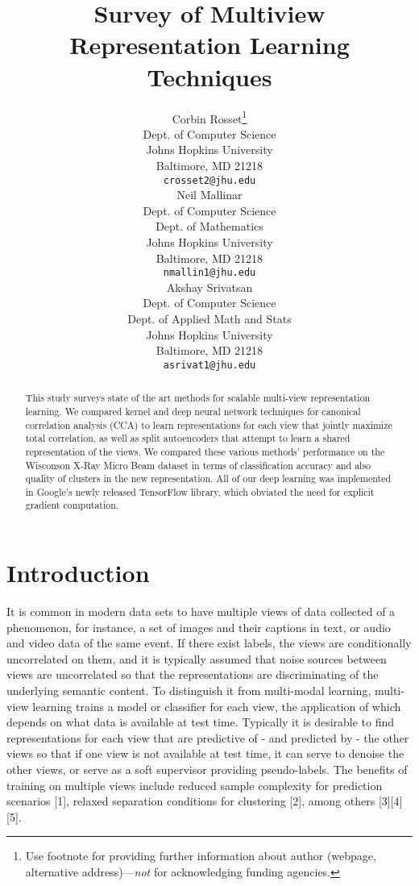 \documentclass{article} %
\title{Survey of Multiview Representation Learning Techniques}
\author{
Corbin Rosset\thanks{ Use footnote for providing further information
about author (webpage, alternative address)---\emph{not} for acknowledging
funding agencies.} \\
Dept. of Computer Science\\
Johns Hopkins University\\
Baltimore, MD 21218 \\
\texttt{crosset2@jhu.edu} \\
\And
Neil Mallinar\\
Dept. of Computer Science \\
Dept. of Mathematics \\
Johns Hopkins University \\
Baltimore, MD 21218 \\
\texttt{nmallin1@jhu.edu} \\
\And
Akshay Srivatsan \\
Dept. of Computer Science \\
Dept. of Applied Math and Stats \\
Johns Hopkins University \\
Baltimore, MD 21218 \\
\texttt{asrivat1@jhu.edu} \\
}
\begin{document}
\maketitle

\begin{abstract}

This study surveys state of the art methods for scalable multi-view representation learning. We compared kernel and deep neural network techniques for canonical correlation analysis (CCA) to learn representations for each view that jointly maximize total correlation, as well as split autoencoders that attempt to learn a shared representation of the views. We compared these various methods' performance on the Wisconson X-Ray Micro Beam dataset in terms of classification accuracy and also quality of clusters in the new representation. All of our deep learning was implemented in Google's newly released TensorFlow library, which obviated the need for explicit gradient computation.

\end{abstract}

\section{Introduction}

It is common in modern data sets to have multiple views of data collected of a phenomenon, for instance, a set of images and their captions in text, or audio and video data of the same event. If there exist labels, the views are conditionally uncorrelated on them, and it is typically assumed that noise sources between views are uncorrelated so that the representations are discriminating of the underlying semantic content. To distinguish it from multi-modal learning, multi-view learning trains a model or classifier for each view, the application of which depends on what data is available at test time. Typically it is desirable to find representations for each view that are predictive of - and predicted by - the other views so that if one view is not available at test time, it can serve to denoise the other views, or serve as a soft supervisor providing pseudo-labels. The benefits of training on multiple views include reduced sample complexity for prediction scenarios [1], relaxed separation conditions for clustering [2], among others [3][4][5]. 
\end{document}
